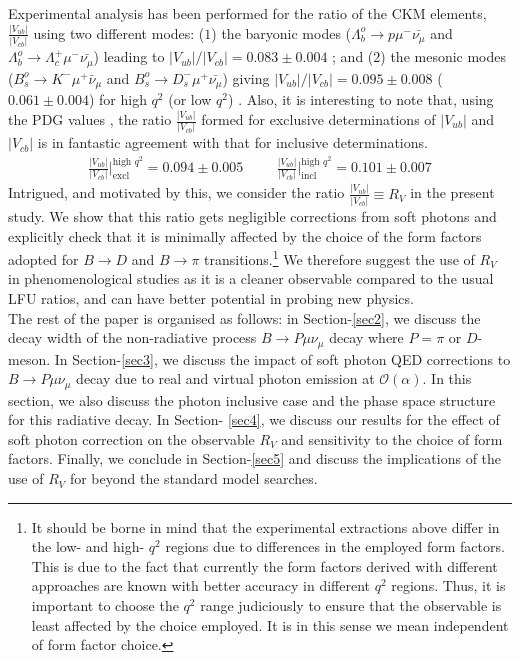 \documentclass[a4paper,11pt]{article}
\begin{document}
	Experimental analysis has been performed for the ratio of the CKM elements, $\frac{|V_{ub}|}{|V_{cb}|}$ using two different
	modes: ($1$) the baryonic modes ($\Lambda_{b}^{o}\to p \mu^{-}\bar{\nu_{\mu}}$ and $\Lambda_{b}^{o}\to \Lambda_{c}^{+} \mu^{-}\bar{\nu_{\mu}}$)
	leading to $|V_{ub}|/|V_{cb}|=0.083\pm 0.004$ \cite{LHCb:2015eia,Detmold:2015aaa}; and 
	($2$) the mesonic modes ($B_{s}^{o}\to K^{-} \mu^{+}\bar{\nu}_{\mu}$ and $B_{s}^{o}\to D_{s}^{-} \mu^{+}\bar{\nu_{\mu}}$)
	giving $|V_{ub}|/|V_{cb}|=0.095\pm 0.008$ ($0.061\pm 0.004$) for high $q^{2}$ (or low $q^{2}$) \cite{LHCb:2020ist}. 
Also, it is interesting to note that, using the PDG values \cite{Zyla:2020zbs}, the ratio $\frac{|V_{ub}|}{|V_{cb}|}$ formed for exclusive determinations of $|V_{ub}|$ and $|V_{cb}|$ is in fantastic 
	agreement with that for inclusive determinations. 
	\begin{eqnarray}
	\frac{|V_{ub}|}{|V_{cb}|}\Big|^{\text{high $q^2$}}_{\text{excl}}=0.094\pm0.005 \hspace{1cm} \frac{|V_{ub}|}{|V_{cb}|}\Big|^{\text{high $q^2$}}_{\text{incl}}=0.101\pm 0.007 
	\label{eqn1s}
	\end{eqnarray}
	 Intrigued, and motivated by this, we consider the ratio $\frac{|V_{ub}|}{|V_{cb}|}\equiv R_V$ in the present study.
	We show that this ratio gets negligible corrections from soft photons and explicitly check that it is minimally
	affected by the choice of the form factors adopted for $B\to D $ and $B\to \pi$ transitions.\footnote{It should be borne in mind that the experimental extractions above differ in the low- and high- $q^2$ regions due to differences in the
	employed form factors. This is due to the fact that currently the form factors derived with different approaches 
	are known with better accuracy in different $q^2$ regions. Thus, it is important to choose the $q^2$ range judiciously to ensure
	that the observable is least affected by the choice employed. It is in this sense we mean independent of form factor choice.}
	We therefore suggest the use of $R_V$ in phenomenological studies as it is a cleaner observable compared to the usual LFU ratios, 
	and can have better potential in probing new physics.\\ 
	The rest of the paper is organised as follows: in Section-\ref{sec2}, we discuss the decay width of the non-radiative process $B\rightarrow P \mu \nu_\mu$ decay where $P=\pi$ or $D$-meson. In Section-\ref{sec3}, we discuss the impact of soft photon QED corrections to $B\rightarrow P \mu \nu_{\mu}$ decay due to real and virtual photon emission at $\mathcal{O}(\alpha)$. In this section, we also discuss the photon inclusive case and the phase space structure for this radiative decay. In Section- \ref{sec4}, we discuss our results for the effect of soft photon correction on the observable $R_V$ and sensitivity to the choice of form factors. Finally, we conclude in Section-\ref{sec5} and discuss the implications of the use of $R_V$ for beyond the standard model searches.
\end{document}
